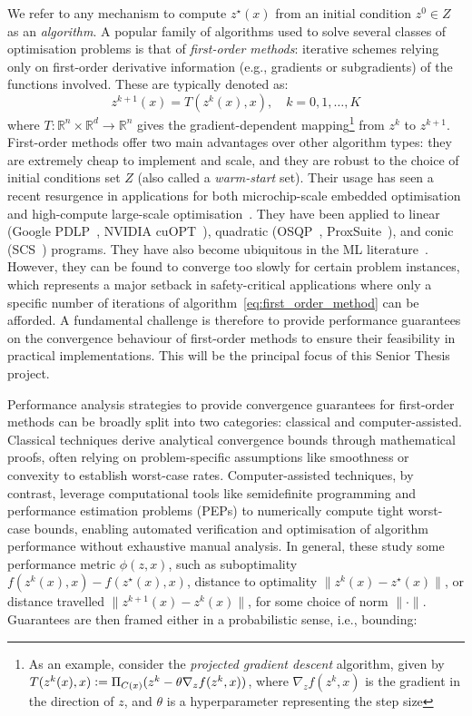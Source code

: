 We refer to any mechanism to compute $z^\star(x)$ from an initial condition $z^0 \in Z$ as an \emph{algorithm}. A popular family of algorithms used to solve several classes of optimisation problems is that of \textit{first-order methods}: iterative schemes relying only on first-order derivative information (e.g., gradients or subgradients) of the functions involved. 
These are typically denoted as:
\begin{equation}\label{eq:first_order_method}
  z^{k+1}(x) = T(z^k(x), x),\quad k=0,1,\dots,K
\end{equation}
where $T: \mathbb{R}^n \times \mathbb{R}^d \rightarrow \mathbb{R}^n$ gives the gradient-dependent mapping\footnote{
As an example, consider the \textit{projected gradient descent} algorithm, given by $T(z^k(x), x) \vcentcolon= \Pi_{C(x)}(z^k-\theta\nabla_zf(z^k,x))$, where $\nabla_zf(z^k,x)$ is the gradient in the direction of $z$, and $\theta$ is a hyperparameter representing the step size} 
from $z^k$ to $z^{k+1}$. First-order methods offer two main advantages over other algorithm types: they are extremely cheap to implement and scale, and they are robust to the choice of initial conditions set $Z$ (also called a \textit{warm-start} set). Their usage has seen a recent resurgence in applications for both microchip-scale embedded optimisation and high-compute large-scale optimisation~\cite{StellatoPresentation2025}. They have been applied to linear (Google PDLP~\cite{googlePDLP}, NVIDIA cuOPT~\cite{NVIDIAcuopt}), quadratic (OSQP~\cite{stellato2020osqp}, ProxSuite~\cite{proxsuite}), and conic (SCS~\cite{SCSconic}) programs. They have also become ubiquitous in the ML literature~\cite{ruder2016overview}. However, they can be found to converge too slowly for certain problem instances, which represents a major setback in safety-critical applications where only a specific number of iterations of algorithm~\eqref{eq:first_order_method} can be afforded. A fundamental challenge is therefore to provide performance guarantees on the convergence behaviour of first-order methods to ensure their feasibility in practical implementations. This will be the principal focus of this Senior Thesis project.

Performance analysis strategies to provide convergence guarantees for first-order methods can be broadly split into two categories: classical and computer-assisted. Classical techniques derive analytical convergence bounds through mathematical proofs, often relying on problem-specific assumptions like smoothness or convexity to establish worst-case rates. Computer-assisted techniques, by contrast, leverage computational tools like semidefinite programming and performance estimation problems (PEPs) to numerically compute tight worst-case bounds, enabling automated verification and optimisation of algorithm performance without exhaustive manual analysis. In general, these study some performance metric $\phi(z,x)$, such as suboptimality $f(z^k(x),x) - f(z^\star(x),x)$, distance to optimality $\|z^k(x) - z^\star(x)\|$, or distance travelled $\|z^{k+1}(x) - z^k(x)\|$, for some choice of norm $\|\cdot\|$.
Guarantees are then framed either in a probabilistic sense, i.e., bounding:


